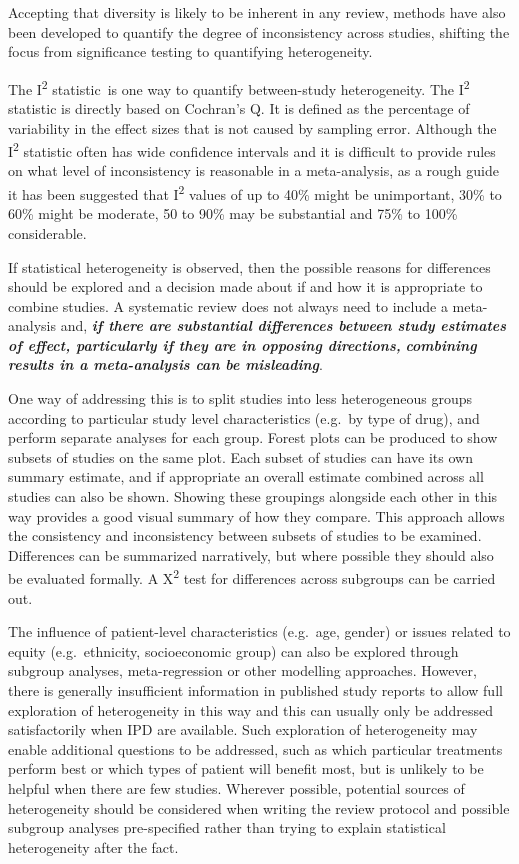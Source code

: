 \documentclass[
  10pt,
  a4paper,
  DIV=11,
  numbers=noendperiod]{scrreprt}
\begin{document}
Accepting that diversity is likely to be inherent in any review, methods
have also been developed to quantify the degree of inconsistency across
studies, shifting the focus from significance testing to quantifying
heterogeneity.

The I\textsuperscript{2} statistic~is one way to quantify between-study
heterogeneity. The I\textsuperscript{2} statistic is directly based on
Cochran's Q. It is defined as the percentage of variability in the
effect sizes that is not caused by sampling error. Although the
I\textsuperscript{2} statistic often has wide confidence intervals and
it is difficult to provide rules on what level of inconsistency is
reasonable in a meta-analysis, as a rough guide it has been suggested
that I\textsuperscript{2} values of up to 40\% might be unimportant,
30\% to 60\% might be moderate, 50 to 90\% may be substantial and 75\%
to 100\% considerable.

If statistical heterogeneity is observed, then the possible reasons for
differences should be explored and a decision made about if and how it
is appropriate to combine studies. A systematic review does not always
need to include a meta-analysis and, \textbf{\emph{if there are
substantial differences between study estimates of effect, particularly
if they are in opposing directions,}} \textbf{\emph{combining results in
a meta-analysis can be misleading}}.

One way of addressing this is to split studies into less heterogeneous
groups according to particular study level characteristics (e.g.~by type
of drug), and perform separate analyses for each group. Forest plots can
be produced to show subsets of studies on the same plot. Each subset of
studies can have its own summary estimate, and if appropriate an overall
estimate combined across all studies can also be shown. Showing these
groupings alongside each other in this way provides a good visual
summary of how they compare. This approach allows the consistency and
inconsistency between subsets of studies to be examined. Differences can
be summarized narratively, but where possible they should also be
evaluated formally. A X\textsuperscript{2} test for differences across
subgroups can be carried out.

The influence of patient-level characteristics (e.g.~age, gender) or
issues related to equity (e.g.~ethnicity, socioeconomic group) can also
be explored through subgroup analyses, meta-regression or other
modelling approaches. However, there is generally insufficient
information in published study reports to allow full exploration of
heterogeneity in this way and this can usually only be addressed
satisfactorily when IPD are available. Such exploration of heterogeneity
may enable additional questions to be addressed, such as which
particular treatments perform best or which types of patient will
benefit most, but is unlikely to be helpful when there are few studies.
Wherever possible, potential sources of heterogeneity should be
considered when writing the review protocol and possible subgroup
analyses pre-specified rather than trying to explain statistical
heterogeneity after the fact.
\end{document}
